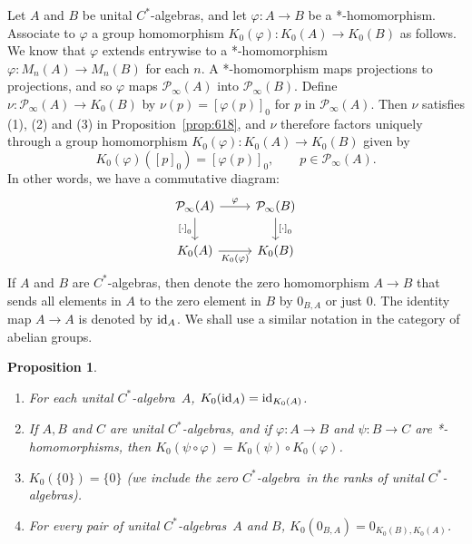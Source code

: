 \documentclass{book}
\newtheorem{proposition}[definition]{Proposition}
\def\cstar{\(C^*\)-algebra}
\def\cstars{\(C^*\)-algebras}
\begin{document}
Let \(A\) and \(B\) be unital \cstars, and let \(\varphi:A\rightarrow B\) be a *-homomorphism. Associate to \(\varphi\) a group
homomorphism \(K_0(\varphi):K_0(A)\rightarrow K_0(B)\) as follows. We know that \(\varphi\) extends entrywise to a *-homomorphism \(\varphi:M_n(A)\rightarrow M_n(B)\) for each \(n\).
A *-homomorphism maps projections to projections, and so \(\varphi\) maps \(\mathcal{P}_\infty(A)\) into \(\mathcal{P}_\infty(B)\).
Define \(\nu:\mathcal{P}_\infty(A)\rightarrow K_0(B)\) by \(\nu(p)={[\varphi(p)]}_0\) for \(p\) in \(\mathcal{P}_\infty(A)\).
Then \(\nu\) satisfies (1), (2) and (3) in Proposition~\ref{prop:618}, and \(\nu\) therefore factors uniquely through a group homomorphism
\(K_0(\varphi):K_0(A)\rightarrow K_0(B)\) given by
\begin{equation}\label{eq:34}
  K_0(\varphi)({[p]}_0)={[\varphi(p)]}_0,\qquad p\in\mathcal{P}_\infty(A).
\end{equation}
In other words, we have a commutative diagram:
\begin{equation}\label{eq:35}
\begin{tikzcd}
\mathcal{P}_\infty(A) \arrow[r, "\varphi"] \arrow[d, swap, "{[\cdot]}_0"]
& \mathcal{P}_\infty(B) \arrow[d, "{[\cdot]}_0"] \\
K_0(A) \arrow[r, swap, "K_0(\varphi)"]
& K_0(B)
\end{tikzcd}
\end{equation}
If \(A\) and \(B\) are \cstars, then denote the zero homomorphism \(A\rightarrow B\) that sends all elements in \(A\) to the zero element in \(B\) by \(0_{B,A}\) or just \(0\).
The identity map \(A\rightarrow A\) is denoted by \(\textnormal{id}_A\). We shall use a similar notation in the category of abelian groups. 
\begin{proposition}\label{prop:624}
  \begin{enumerate}
    \item For each unital \cstar\ \(A\), \(K_0(\textnormal{id}_A)=\textnormal{id}_{K_0(A)}\).
    \item If \(A, B\) and \(C\) are unital \cstars, and if \(\varphi:A\rightarrow B\) and \(\psi:B\rightarrow C\) 
    are *-homomorphisms, then \(K_0(\psi\circ\varphi)=K_0(\psi)\circ K_0(\varphi)\).
    \item \(K_0(\{0\})=\{0\}\) (we include the zero \cstar\ in the ranks of unital \cstars).
    \item For every pair of unital \cstars\ \(A\) and \(B\), \(K_0(0_{B,A})=0_{K_0(B),K_0(A)}\).
  \end{enumerate}
\end{proposition}
\end{document}
